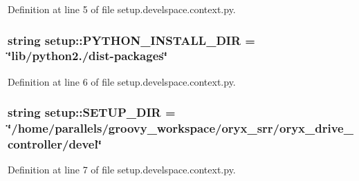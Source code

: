\-Definition at line 5 of file setup.\-develspace.\-context.\-py.

\subsubsection[{\-P\-Y\-T\-H\-O\-N\-\_\-\-I\-N\-S\-T\-A\-L\-L\-\_\-\-D\-I\-R}]{\setlength{\rightskip}{0pt plus 5cm}string {\bf setup\-::\-P\-Y\-T\-H\-O\-N\-\_\-\-I\-N\-S\-T\-A\-L\-L\-\_\-\-D\-I\-R} = \char`\"{}lib/python2./dist-\/packages\char`\"{}}\label{namespacesetup_aeca0160af888aac6e3bd8a065852b61f}


\-Definition at line 6 of file setup.\-develspace.\-context.\-py.

\subsubsection[{\-S\-E\-T\-U\-P\-\_\-\-D\-I\-R}]{\setlength{\rightskip}{0pt plus 5cm}string {\bf setup\-::\-S\-E\-T\-U\-P\-\_\-\-D\-I\-R} = \char`\"{}/home/parallels/groovy\-\_\-workspace/oryx\-\_\-srr/oryx\-\_\-drive\-\_\-controller/devel\char`\"{}}\label{namespacesetup_a98792229e61a663fcdf89c12b1f1dbc2}


\-Definition at line 7 of file setup.\-develspace.\-context.\-py.

